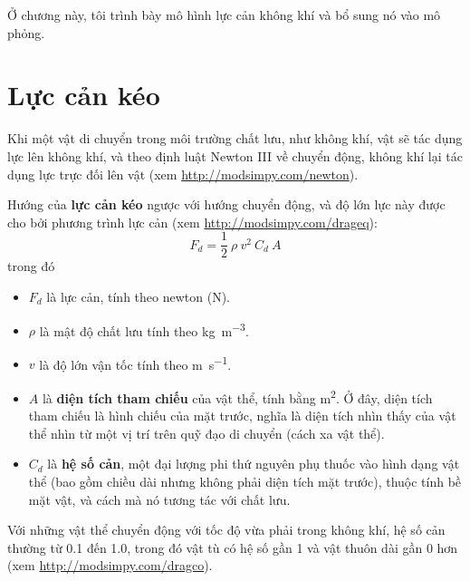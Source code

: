 \documentclass[12pt]{book}
\theoremstyle{exercise}
\begin{document}
Ở chương này, tôi trình bày mô hình lực cản không khí và bổ sung nó vào mô phỏng.


\section{Lực cản kéo}
\label{drag}

Khi một vật di chuyển trong môi trường chất lưu, như không khí, vật sẽ tác dụng lực lên không khí, và theo định luật Newton III về chuyển động, không khí lại tác dụng lực trực đối lên vật (xem \url{http://modsimpy.com/newton}).


Hướng của {\bf lực cản kéo} ngược với hướng chuyển động, và độ lớn lực này được cho bởi phương trình lực cản (xem \url{http://modsimpy.com/drageq}):
%
\[ F_d = \frac{1}{2}~\rho~v^2~C_d~A \]
%
trong đó

\begin{itemize}

\item $F_d$ là lực cản, tính theo newton (\si{\newton}).

\item $\rho$ là mật độ chất lưu tính theo \si{\kg\per\meter\cubed}.

\item $v$ là độ lớn vận tốc tính theo \si{\meter\per\second}.

\item $A$ là {\bf diện tích tham chiếu} của vật thể, tính bằng \si{\meter\squared}.  Ở đây, diện tích tham chiếu là hình chiếu của mặt trước, nghĩa là diện tích nhìn thấy của vật thể nhìn từ một vị trí trên quỹ đạo di chuyển (cách xa vật thể).


\item $C_d$ là {\bf hệ số cản}, một đại lượng phi thứ nguyên phụ thuốc vào hình dạng vật thể (bao gồm chiều dài nhưng không phải diện tích mặt trước), thuộc tính bề mặt vật, và cách mà nó tương tác với chất lưu.


\end{itemize}

Với những vật thể chuyển động với tốc độ vừa phải trong không khí, hệ số cản thường từ 0.1 đến 1.0, trong đó vật tù có hệ số gần 1 và vật thuôn dài gần 0 hơn (xem \url{http://modsimpy.com/dragco}).
\end{document}
